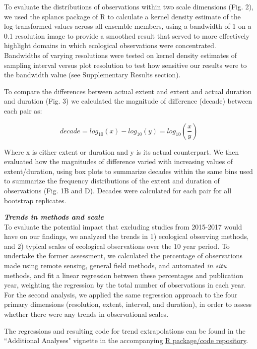 \documentclass[12pt]{article}
\begin{document}
To evaluate the distributions of observations within two scale dimensions (Fig. 2), we used the splancs package \cite{rowlingson_splancs:_1993} of R \cite{r_development_core_team_r:_2011} to calculate a kernel density estimate of the log-transformed values across all ensemble members, using a bandwidth of 1 on a 0.1 resolution image to provide a smoothed result that served to more effectively highlight domains in which ecological observations were concentrated. Bandwidths of varying resolutions were tested on kernel density estimates of sampling interval versus plot resolution to test how sensitive our results were to the bandwidth value (see Supplementary Results section).  

To compare the differences between actual extent and extent and actual duration and duration (Fig. 3) we calculated the magnitude of difference (decade) between each pair as:

\begin{equation}
decade = log_{10}(x) - log_{10}(y) = log_{10}\left(\frac{x}{y}\right)
\end{equation}

\noindent Where x is either extent or duration and y is its actual counterpart. We then evaluated how the magnitudes of difference varied with increasing values of extent/duration, using box plots to summarize decades within the same bins used to summarize the frequency distributions of the extent and duration of observations (Fig. 1B and D). Decades were calculated for each pair for all bootstrap replicates. 

\vspace{5pt}
\noindent \textbf{\emph{Trends in methods and scale}}\\
To evaluate the potential impact that excluding studies from 2015-2017 would have on our findings, we analyzed the trends in 1) ecological observing methods, and 2) typical scales of ecological observations over the 10 year period. To undertake the former assessment, we calculated the percentage of observations made using remote sensing, general field methods, and automated \emph{in situ} methods, and fit a linear regression between these percentages and publication year, weighting the regression by the total number of observations in each year. For the second analysis, we applied the same regression approach to the four primary dimensions (resolution, extent, interval, and duration), in order to assess whether there were any trends in observational scales.  

The regressions and resulting code for trend extrapolations can be found in the ``Additional Analyses" vignette in the accompanying \href{https://github.com/agroimpacts/ecoscales}{R package/code repository}.
\end{document}
